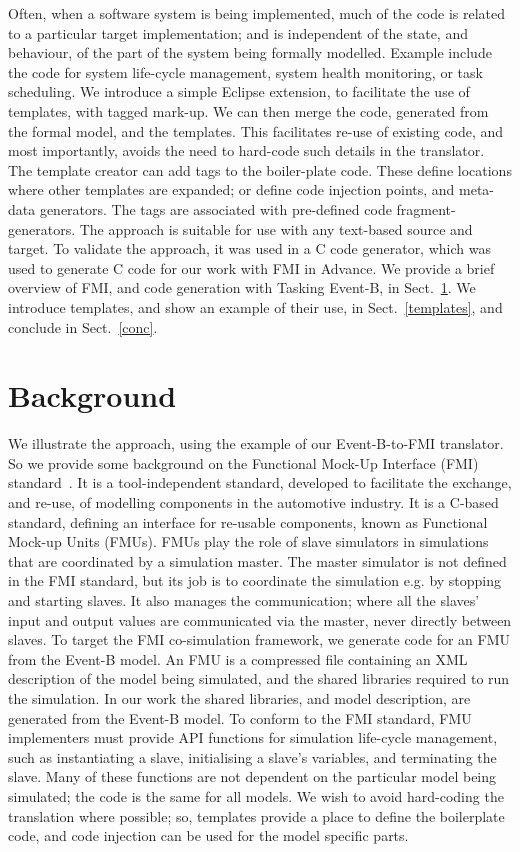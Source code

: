 \documentclass{llncs}%
\begin{document}
Often, when a software system is being implemented, much of the code is related to a particular target implementation; and is independent of the state, and behaviour, of the part of the system being formally modelled. Example include the code for system life-cycle management, system health monitoring, or task scheduling. We introduce a simple Eclipse extension, to facilitate the use of templates, with tagged mark-up. We can then merge the  code, generated from the formal model,  and the templates. This facilitates re-use of existing code, and most importantly, avoids the need to hard-code such details in the translator. The template creator can add tags to the boiler-plate code. These define locations where other templates are expanded; or define code injection points, and meta-data generators. The tags are associated with pre-defined code fragment-generators. The approach is suitable for use with any text-based source and target. To validate the approach, it was used in a C code generator, which was used to generate C code for our work with FMI in Advance. We provide a brief overview of FMI, and code generation with Tasking Event-B, in Sect.~\ref{Background}. We introduce templates, and show an example of their use, in Sect.~\ref{templates}, and conclude in Sect.~\ref{conc}.
%
%
\section{Background}\label{Background}
%
We illustrate the approach, using the example of our Event-B-to-FMI translator. So we provide some background on the Functional Mock-Up Interface (FMI) standard~\cite{FMISTD}. It is a tool-independent standard, developed to facilitate the exchange, and re-use, of modelling components in the automotive industry. It is a C-based standard, defining an interface for re-usable components, known as Functional Mock-up Units (FMUs). FMUs play the role of slave simulators in simulations that are coordinated by a simulation master. The master simulator is not defined in the FMI standard, but its job is to coordinate the simulation e.g. by stopping and starting slaves. It also manages the communication; where all the slaves' input and output values are communicated via the master, never directly between slaves. To target the FMI co-simulation framework, we generate code for an FMU from the Event-B model. An FMU is a compressed file containing an XML description of the model being simulated, and the shared libraries required to run the simulation. In our work the shared libraries, and model description, are generated from the Event-B model. To conform to the FMI standard, FMU implementers must provide API functions for simulation life-cycle management, such as instantiating a slave, initialising a slave's variables, and terminating the slave. Many of these functions are not dependent on the particular model being simulated; the code is the same for all models. We wish to avoid hard-coding the translation where possible; so, templates provide a place to define the boilerplate code, and code injection can be used for the model specific parts.    
\end{document}
